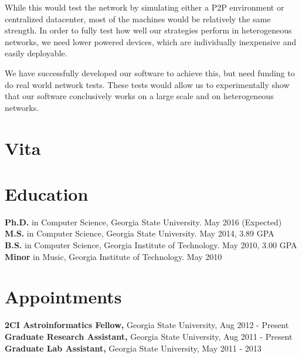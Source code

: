\documentclass[12pt,a4paper]{article}
\begin{document}

While this would test the network by simulating either a P2P environment or centralized datacenter, most of the machines would be relatively the same strength.
In order to fully test how well our strategies perform in heterogeneous networks, we need lower powered devices, which are individually inexpensive and easily deployable.

We have successfully developed our software to achieve this, but need funding to do real world network tests. 
These tests would allow us to experimentally show that our software conclusively works on a large scale and on heterogeneous networks.





\newpage



\section{Vita}

\section*{Education}          
    
{\bf Ph.D.} in Computer Science, Georgia State University. May 2016 (Expected)\\
{\bf M.S.} in Computer Science, Georgia State University. May 2014, 3.89 GPA \\
{\bf B.S.} in Computer Science, Georgia Institute of Technology. May 2010, 3.00 GPA\\
{\bf Minor} in Music, Georgia Institute of Technology. May 2010\\
	
\section*{Appointments}
{\bf 2CI Astroinformatics Fellow,} Georgia State University, Aug 2012 - Present\\
{\bf Graduate Research Assistant,} Georgia State University, Aug 2011 - Present\\
{\bf Graduate Lab Assistant,} Georgia State University, May 2011 - 2013
\end{document}
